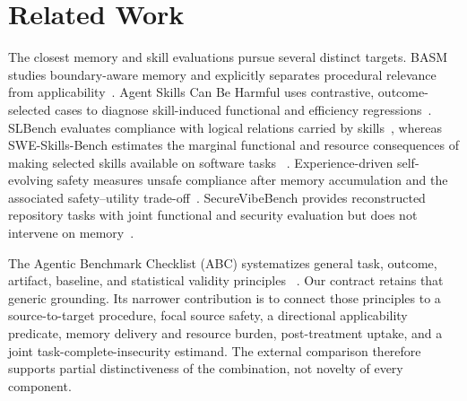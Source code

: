 \section{Related Work}
\label{sec:related}

The closest memory and skill evaluations pursue several distinct targets.
BASM studies boundary-aware memory and explicitly separates procedural
relevance from applicability~\cite{lin2026basm}.  Agent Skills Can Be Harmful
uses contrastive, outcome-selected cases to diagnose skill-induced functional
and efficiency regressions~\cite{dong2026harmfulskills}.  SLBench evaluates
compliance with logical relations carried by skills~\cite{chen2026slbench},
whereas SWE-Skills-Bench estimates the marginal functional and resource
consequences of making selected skills available on software tasks
~\cite{han2026sweskills}.  Experience-driven self-evolving safety measures
unsafe compliance after memory accumulation and the associated safety--utility
trade-off~\cite{zhao2026safetyrisks}.  SecureVibeBench provides reconstructed
repository tasks with joint functional and security evaluation but does not
intervene on memory~\cite{chen2026securevibebench}.

The Agentic Benchmark Checklist (ABC) systematizes general task, outcome,
artifact, baseline, and statistical validity principles
~\cite{zhu2025agenticbenchmarks}.  Our contract retains that generic grounding.
Its narrower contribution is to connect those principles to a source-to-target
procedure, focal source safety, a directional applicability predicate, memory
delivery and resource burden, post-treatment uptake, and a joint
task-complete-insecurity estimand.  The external comparison therefore supports
partial distinctiveness of the combination, not novelty of every component.
